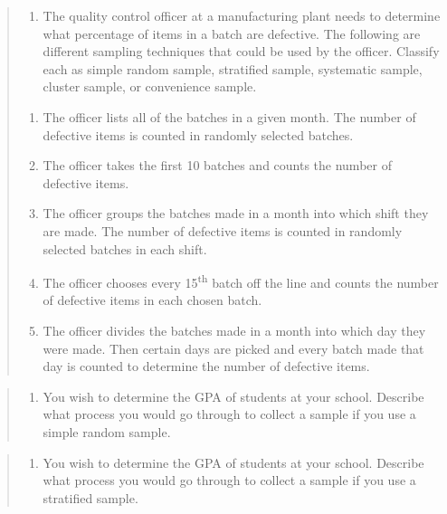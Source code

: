 \documentclass[]{book}
\providecommand{\tightlist}{%
  \setlength{\itemsep}{0pt}\setlength{\parskip}{0pt}}
\begin{document}
\begin{quote}
\begin{enumerate}
\def\labelenumi{\arabic{enumi}.}
\setcounter{enumi}{1}
\tightlist
\item
  The quality control officer at a manufacturing plant needs to
  determine what percentage of items in a batch are defective. The
  following are different sampling techniques that could be used by
  the officer. Classify each as simple random sample, stratified
  sample, systematic sample, cluster sample, or convenience sample.
\end{enumerate}

\begin{enumerate}
\def\labelenumi{\alph{enumi}.}
\tightlist
\item
  The officer lists all of the batches in a given month. The number of defective items is counted in randomly selected batches.
\item
  The officer takes the first 10 batches and counts the number of defective items.
\item
  The officer groups the batches made in a month into which shift they are made. The number of defective items is counted in randomly selected batches in each shift.
\item
  The officer chooses every 15\textsuperscript{th} batch off the line and counts the number of defective items in each chosen batch.
\item
  The officer divides the batches made in a month into which day they were made. Then certain days are picked and every batch made that day is counted to determine the number of defective items.
\end{enumerate}
\end{quote}

\begin{quote}
\begin{enumerate}
\def\labelenumi{\arabic{enumi}.}
\setcounter{enumi}{2}
\tightlist
\item
  You wish to determine the GPA of students at your school. Describe what process you would go through to collect a sample if you use a simple random sample.
\end{enumerate}
\end{quote}

\begin{quote}
\begin{enumerate}
\def\labelenumi{\arabic{enumi}.}
\setcounter{enumi}{3}
\tightlist
\item
  You wish to determine the GPA of students at your school. Describe what process you would go through to collect a sample if you use a stratified sample.
\end{enumerate}
\end{quote}
\end{document}

